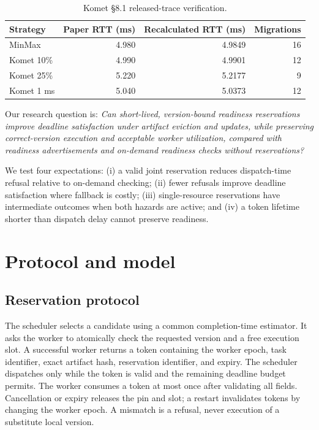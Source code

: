 \documentclass[11pt,a4paper]{article}
\begin{document}
\begin{table}[ht]
\centering
\caption{Komet \S8.1 released-trace verification.}
\label{tab:komet}
\small
\begin{tabular}{lrrr}
\toprule
Strategy & Paper RTT (ms) & Recalculated RTT (ms) & Migrations \\
\midrule
MinMax & 4.980 & 4.9849 & 16 \\
Komet 10\% & 4.990 & 4.9901 & 12 \\
Komet 25\% & 5.220 & 5.2177 & 9 \\
Komet 1 ms & 5.040 & 5.0373 & 12 \\
\bottomrule
\end{tabular}
\end{table}

Our research question is: \emph{Can short-lived, version-bound readiness reservations improve deadline satisfaction under artifact eviction and updates, while preserving correct-version execution and acceptable worker utilization, compared with readiness advertisements and on-demand readiness checks without reservations?}

We test four expectations: (i) a valid joint reservation reduces dispatch-time refusal relative to on-demand checking; (ii) fewer refusals improve deadline satisfaction where fallback is costly; (iii) single-resource reservations have intermediate outcomes when both hazards are active; and (iv) a token lifetime shorter than dispatch delay cannot preserve readiness.

\section{Protocol and model}

\subsection{Reservation protocol}

The scheduler selects a candidate using a common completion-time estimator. It asks the worker to atomically check the requested version and a free execution slot. A successful worker returns a token containing the worker epoch, task identifier, exact artifact hash, reservation identifier, and expiry. The scheduler dispatches only while the token is valid and the remaining deadline budget permits. The worker consumes a token at most once after validating all fields. Cancellation or expiry releases the pin and slot; a restart invalidates tokens by changing the worker epoch. A mismatch is a refusal, never execution of a substitute local version.
\end{document}
